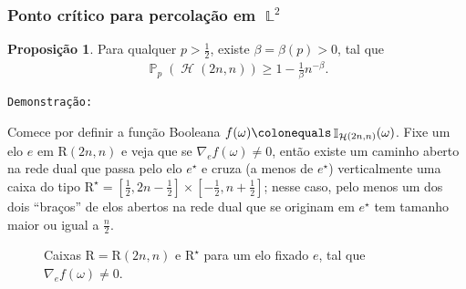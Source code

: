 \documentclass[9pt]{beamer}
\theoremstyle{definition} %
\newtheorem{mypro}{Proposição}
\DeclareMathOperator{\PX}{\mathbb{P}} %
\DeclareMathOperator{\IX}{\mathbb{I}} %
\DeclareMathOperator{\LX}{\mathbb{L}} %
\DeclareMathOperator{\HL}{\mathcal{H}} %
\newcommand{\diffe}{{\nabla_e}f(\omega)}
\begin{document}
	\begin{frame}[t]
		\frametitle{Ponto crítico para percolação em $\LX^2$}
		\begin{mypro}\label{prop:beta}
			Para qualquer $p > \frac{1}{2}$, existe $\beta = \beta(p) > 0$, tal que 
			\begin{align*}
			\PX_p(\HL(2n, n)) \geq 1 - \frac{1}{\beta}n^{-\beta}.
			\end{align*}
		\end{mypro}
		\vspace{-3pt}\pause
		\texttt{Demonstração:}
		
		\begin{minipage}{0.50 \textwidth}
			Comece por definir a função Booleana $f(\omega) \colonequals \IX_{\HL(2n, n)}(\omega)$. Fixe um elo $e$ em $\text{R}(2n, n)$ e veja que se $\diffe \neq 0$, então existe um caminho aberto na rede dual que passa pelo elo $e^{\star}$ e cruza (a menos de $e^{\star}$) verticalmente uma caixa do tipo $\text{R}^{\star} = \left[\frac{1}{2}, 2n - \frac{1}{2}\right] \times [-\frac{1}{2}, n + \frac{1}{2}]$; nesse caso, pelo menos um dos dois ``braços'' de elos abertos na rede dual que se originam em $e^{\star}$ tem tamanho maior ou igual a $\frac{n}{2}$.
		\end{minipage}
		\begin{minipage}{0.50 \textwidth}
			\begin{figure}
				
				\vspace{-9pt}
				\caption{\justifying Caixas $\text{R} = \text{R}(2n, n)$ e $\text{R}^{\star}$ para um elo fixado $e$, tal que $\diffe \neq 0$.}
				\label{fig:caixa-2n}
			\end{figure}
		\end{minipage}
	\end{frame}
\end{document}
